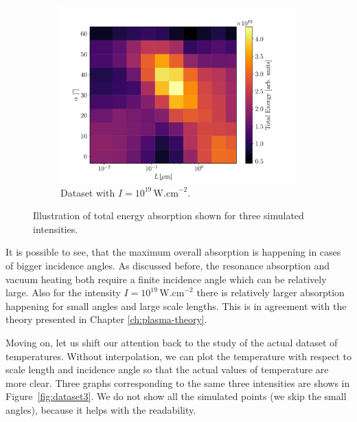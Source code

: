 \begin{figure}[ht]
\begin{subfigure}{0.49\textwidth}
		\centering
		\includegraphics[width=\textwidth]{figures/I_1e19_cut_10}
		\caption{Dataset with $I = 10^{19} \, \mathrm{W.cm}^{-2}$.}
		\label{fig:dataset2-c}
	\end{subfigure}
	\caption{Illustration of total energy absorption shown for three simulated intensities.}
	\label{fig:dataset2}
\end{figure}

It is possible to see, that the maximum overall absorption is happening in cases of bigger incidence angles. As discussed before, the resonance absorption and vacuum heating both require a finite incidence angle which can be relatively large. Also for the intensity $I = 10^{19} \, \mathrm{W.cm}^{-2}$ there is relatively larger absorption happening for small angles and large scale lengths. This is in agreement with the theory presented in Chapter \ref{ch:plasma-theory}.

Moving on, let us shift our attention back to the study of the actual dataset of temperatures. Without interpolation, we can plot the temperature with respect to scale length and incidence angle so that the actual values of temperature are more clear. Three graphs corresponding	 to the same three intensities are shows in Figure~\ref{fig:dataset3}. We do not show all the simulated points (we skip the small angles), because it helps with the readability.

